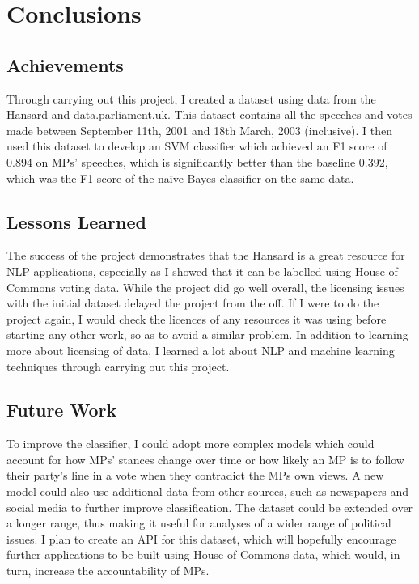 \documentclass[12pt,a4paper,twoside,openright]{report}
\begin{document}
\chapter{Conclusions} \label{conc}

\section{Achievements}

Through carrying out this project, I created a dataset using data from the Hansard and data.parliament.uk. This dataset contains all the speeches and votes made between September 11th, 2001 and 18th March, 2003 (inclusive). I then used this dataset to develop an SVM classifier which achieved an F1 score of 0.894 on MPs' speeches, which is significantly better than the baseline 0.392, which was the F1 score of the na\"{i}ve Bayes classifier on the same data.

\section{Lessons Learned}

The success of the project demonstrates that the Hansard is a great resource for NLP applications, especially as I showed that it can be labelled using House of Commons voting data. While the project did go well overall, the licensing issues with the initial dataset delayed the project from the off. If I were to do the project again, I would check the licences of any resources it was using before starting any other work, so as to avoid a similar problem. In addition to learning more about licensing of data, I learned a lot about NLP and machine learning techniques through carrying out this project.

\section{Future Work}

To improve the classifier, I could adopt more complex models which could account for how MPs' stances change over time or how likely an MP is to follow their party's line in a vote when they contradict the MPs own views. A new model could also use additional data from other sources, such as newspapers and social media to further improve classification. The dataset could be extended over a longer range, thus making it useful for analyses of a wider range of political issues. I plan to create an API for this dataset, which will hopefully encourage further applications to be built using House of Commons data, which would, in turn, increase the accountability of MPs.
\end{document}
